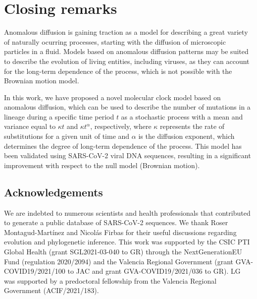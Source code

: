 \documentclass{./LatexTemplate/svproc}
\begin{document}
\section{Closing remarks}

Anomalous diffusion is gaining traction as a model for describing a great variety of naturally ocurring processes, starting with the diffusion of microscopic particles in a fluid. Models based on anomalous diffusion patterns may be suited to describe the evolution of living entities, including viruses, as they can account for the long-term dependence of the process, which is not possible with the Brownian motion model.

In this work, we have proposed a novel molecular clock model based on anomalous diffusion, which can be used to describe the number of mutations in a lineage during a specific time period $t$ as a stochastic process with a mean and variance equal to $\kappa t$ and $\kappa t^\alpha$, respectively, where $\kappa$ represents the rate of substitutions for a given unit of time and $\alpha$ is the diffusion exponent, which determines the degree of long-term dependence of the process. This model has been validated using SARS-CoV-2 viral DNA sequences, resulting in a significant improvement with respect to the null model (Brownian motion).

\subsection*{Acknowledgements}

We are indebted to numerous scientists and health professionals that contributed to generate a public database of SARS-CoV-2 sequences. We thank Roser Montagud-Martínez and Nicolás Firbas for their useful discussions regarding evolution and phylogenetic inference. This work was supported by the CSIC PTI Global Health (grant SGL2021-03-040 to GR) through the NextGenerationEU Fund (regulation 2020/2094) and the Valencia Regional Government (grant GVA-COVID19/2021/100 to JAC and grant GVA-COVID19/2021/036 to GR). LG was supported by a predoctoral fellowship from the Valencia Regional Government (ACIF/2021/183).
\end{document}
